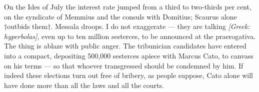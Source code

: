  On the Ides of July the interest rate jumped from a third to two-thirds per cent, on the syndicate of Memmius and the consuls with Domitius; Scaurus alone †outbids them†. Messala droops. I do not exaggerate --- they are talking \textit{[Greek: hyperbolas]}, even up to ten million sesterces, to be announced at the praerogativa. The thing is ablaze with public anger. The tribunician candidates have entered into a compact, depositing 500,000 sesterces apiece with Marcus Cato, to canvass on his terms --- so that whoever transgressed should be condemned by him. If indeed these elections turn out free of bribery, as people suppose, Cato alone will have done more than all the laws and all the courts.
